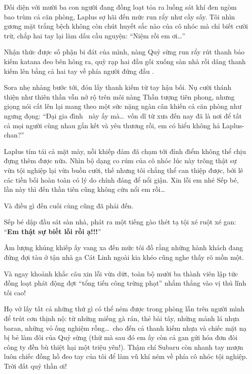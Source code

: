 \documentclass[../main.tex]{subfiles}
\begin{document}
Đối diện với mười ba con người đang đồng loạt tỏa ra luồng sát khí đen ngòm bao trùm cả căn phòng, Laplus sợ hãi đến mức run rẩy như cầy sấy. Tôi nhìn gương mặt trắng bệch không còn chút huyết sắc nào của cô nhóc mà chỉ biết cười trừ, chắp hai tay lại làm dấu cầu nguyện: ``Niệm rồi em ơi\dots''

Nhận thức được số phận bi đát của mình, nàng Quỷ sừng run rẩy rút thanh bảo kiếm katana đeo bên hông ra, quỳ rạp hai đầu gối xuống sàn nhà rồi dâng thanh kiếm lên bằng cả hai tay về phía người đứng đầu \hll.


Sora nhẹ nhàng bước tới, đón lấy thanh kiếm từ tay hậu bối. Nụ cười thánh thiện như thiên thần vẫn nở rộ trên môi nàng Thần tượng tiên phong, nhưng giọng nói cất lên lại mang theo một sức nặng ngàn cân khiến cả căn phòng như ngưng đọng: ``Đại gia đình \hll\ này ấy mà\dots\ vốn dĩ từ xưa đến nay đã là nơi để tất cả mọi người cùng nhau gắn kết và yêu thương rồi, em có hiểu không hả Laplus-chan?''


Laplus tím tái cả mặt mày, nỗi khiếp đảm đã chạm tới đỉnh điểm không thể chịu đựng thêm được nữa. Nhìn bộ dạng co rúm của cô nhóc lúc này trông thật sự vừa tội nghiệp lại vừa buồn cười, thế nhưng tôi chẳng thể can thiệp được, bởi lẽ các tiền bối hoàn toàn có lý do chính đáng để nổi giận. Xin lỗi em nhé Sếp bé, lần này thì đến thần tiên cũng không cứu nổi em rồi\dots

Và điều gì đến cuối cùng cũng đã phải đến.

Sếp bé dập đầu sát sàn nhà, phát ra một tiếng gào thét tạ tội xé ruột xé gan: ``\textbf{Em thật sự biết lỗi rồi ạ!!!}''

Âm lượng khủng khiếp ấy vang xa đến mức tôi đồ rằng những hành khách đang đứng đợi tàu ở tận nhà ga Cát Linh ngoài kia khéo cũng nghe thấy rõ mồn một.

Và ngay khoảnh khắc câu xin lỗi vừa dứt, toàn bộ mười ba thành viên lập tức đồng loạt phát động đợt ``tổng tiến công trừng phạt'' nhắm thẳng vào vị thủ lĩnh tối cao!

Họ vớ lấy tất cả những thứ gì có thể ném được trong phòng lẫn trên người mình để trút cơn thịnh nộ: từ những miếng gà rán, thẻ bài tây, những mảnh lá nhựa baran, những vỏ ống nghiệm rỗng\dots\ cho đến cả thanh kiếm nhựa và chiếc mặt nạ bị bẻ làm đôi của Quỷ sừng (thứ mà sau đó em ấy còn cả gan gửi hóa đơn đòi công ty đền bù thiệt hại một triệu yên!). Thậm chí Subaru còn nhanh tay mượn luôn chiếc đồng hồ đeo tay của tôi để làm vũ khí ném về phía cô nhóc tội nghiệp. Trời đất quỷ thần ơi!
\end{document}
